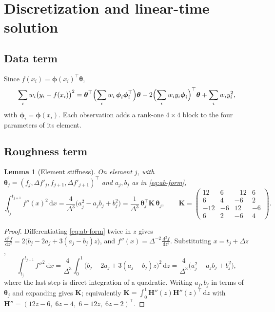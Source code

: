 \documentclass[11pt,a4paper]{article}
\newtheorem{lemma}[theorem]{Lemma}
\theoremstyle{definition}
\theoremstyle{remark}
\newcommand{\vth}{\boldsymbol{\theta}}
\newcommand{\vphi}{\boldsymbol{\phi}}
\newcommand{\mK}{\mathbf{K}}
\newcommand{\dd}{\,\mathrm{d}}
\begin{document}
\section{Discretization and linear-time solution}
\label{sec:discretization}

\subsection{Data term}

Since $f(x_i)=\vphi(x_i)^\top\vth$,
\begin{equation}
\sum_i w_i\bigl(y_i-f(x_i)\bigr)^2=\vth^\top\Bigl(\sum_i w_i\,\vphi_i\vphi_i^\top\Bigr)\vth-2\Bigl(\sum_i w_i y_i\vphi_i\Bigr)^\top\vth+\sum_i w_i y_i^2,
\end{equation}
with $\vphi_i=\vphi(x_i)$. Each observation adds a rank-one $4\times 4$ block to the four parameters of its element.

\subsection{Roughness term}

\begin{lemma}[Element stiffness]
\label{lem:stiffness}
On element $j$, with $\vth_j=(f_j,\Delta f'_j,f_{j+1},\Delta f'_{j+1})^\top$ and $a_j,b_j$ as in \eqref{eq:ab-form},
\begin{equation}
\label{eq:stiffness}
\int_{t_j}^{t_{j+1}}f''(x)^2\dd x=\frac{4}{\Delta^3}\bigl(a_j^2-a_jb_j+b_j^2\bigr)=\frac{1}{\Delta^3}\,\vth_j^\top\mK\,\vth_j,
\qquad
\mK=\begin{pmatrix}12&6&-12&6\\6&4&-6&2\\-12&-6&12&-6\\6&2&-6&4\end{pmatrix}.
\end{equation}
\end{lemma}

\begin{proof}
Differentiating \eqref{eq:ab-form} twice in $z$ gives $\frac{\dd^2 f}{\dd z^2}=2\bigl(b_j-2a_j+3(a_j-b_j)z\bigr)$, and $f''(x)=\Delta^{-2}\frac{\dd^2 f}{\dd z^2}$. Substituting $x=t_j+\Delta z$,
\[
\int_{t_j}^{t_{j+1}}f''^2\dd x=\frac{4}{\Delta^3}\int_0^1\bigl(b_j-2a_j+3(a_j-b_j)z\bigr)^2\dd z=\frac{4}{\Delta^3}\bigl(a_j^2-a_jb_j+b_j^2\bigr),
\]
where the last step is direct integration of a quadratic. Writing $a_j,b_j$ in terms of $\vth_j$ and expanding gives $\mK$; equivalently $\mK=\int_0^1\mathbf H''(z)\mathbf H''(z)^\top\dd z$ with $\mathbf H''=(12z-6,\;6z-4,\;6-12z,\;6z-2)^\top$.
\end{proof}
\end{document}
